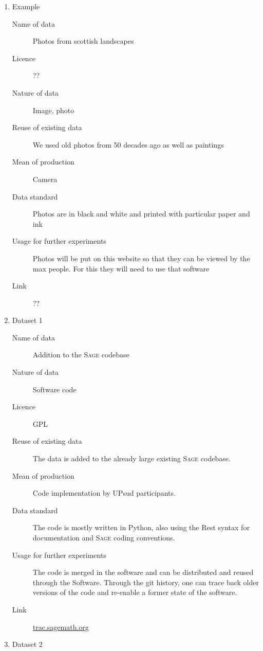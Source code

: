 \documentclass[12pt]{article}
\newcommand{\software}[1]{\textsc{#1}\xspace}
\newcommand{\Sage}{\software{Sage}}
\begin{document}
\begin{enumerate}


\item{Example}


\begin{description}
\item[Name of data] Photos from scottish landscapes
\item[Licence]  ??
\item[Nature of data] Image, photo
\item[Reuse of existing data] We used old photos from 50 decades ago as well as paintings
\item[Mean of production] Camera
\item[Data standard] Photos are in black and white and printed with particular paper and ink
\item [Usage for further experiments] Photos will be put on this website so that they can be viewed by the max people. For this they will need to use that software
\item [Link] ??
\end{description}


\item {Dataset 1}


\begin{description}
\item[Name of data] Addition to the \Sage codebase
\item[Nature of data] Software code
\item[Licence] GPL
\item[Reuse of existing data] The data is added to the already large existing \Sage codebase.
\item[Mean of production] Code implementation by UPsud participants.
\item[Data standard] The code is mostly written in Python, also using the Rest syntax for documentation and \Sage coding conventions.
\item [Usage for further experiments] The code is merged in the software and can be distributed and reused through the Software. Through the git history,
one can trace back older versions of the code and re-enable a former state of the software.
\item [Link] \href{http://trac.sagemath.org/}{trac.sagemath.org}
\end{description}


\item{Dataset 2}



\end{enumerate}
\end{document}
